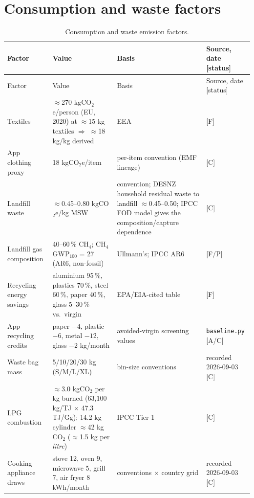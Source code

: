 \documentclass[11pt,a4paper]{article}
\begin{document}
\section{Consumption and waste factors}
\label{sec:waste}

\begin{longtable}{@{}p{4.6cm}p{3.4cm}p{4.6cm}p{3.6cm}@{}}
\caption{Consumption and waste emission factors.}\label{tab:waste}\\
\toprule
Factor & Value & Basis & Source, date [status] \\
\midrule
\endfirsthead
\toprule
Factor & Value & Basis & Source, date [status] \\
\midrule
\endhead
Textiles & $\approx$270 kgCO$_2$e/person (EU, 2020) at $\approx$15 kg textiles $\Rightarrow$ $\approx$18 kg/kg derived & EEA & \cite{eea_textiles} [F] \\
App clothing proxy & 18 kgCO$_2$e/item & per-item convention (EMF lineage) & \cite{emf_textiles} [C] \\
Landfill waste & $\approx$0.45--0.80 kgCO$_2$e/kg MSW & convention; DESNZ household residual waste to landfill $\approx$0.45--0.50; IPCC FOD model gives the composition/capture dependence & \cite{desnz2025, ipcc2006_vol5} [C] \\
Landfill gas composition & 40--60\,\% CH$_4$; CH$_4$ GWP$_{100}$ = 27 (AR6, non-fossil) & Ullmann's; IPCC AR6 & \cite{wiki_landfill, ipcc_ar6_ch7} [F/P] \\
Recycling energy savings & aluminium 95\,\%, plastics 70\,\%, steel 60\,\%, paper 40\,\%, glass 5--30\,\% vs.\ virgin & EPA/EIA-cited table & \cite{wiki_recycling} [F] \\
App recycling credits & paper $-4$, plastic $-6$, metal $-12$, glass $-2$ kg/month & avoided-virgin screening values & \texttt{baseline.py} [A/C] \\
Waste bag mass & 5/10/20/30 kg (S/M/L/XL) & bin-size conventions & recorded 2026-09-03 [C] \\
LPG combustion & $\approx$3.0 kgCO$_2$ per kg burned (63{,}100 kg/TJ $\times$ 47.3 TJ/Gg); 14.2 kg cylinder $\approx$42 kg CO$_2$ ($\approx$1.5 kg per \emph{litre}) & IPCC Tier-1 & \cite{ipcc2006_vol2} [C] \\
Cooking appliance draws & stove 12, oven 9, microwave 5, grill 7, air fryer 8 kWh/month & conventions $\times$ country grid & recorded 2026-09-03 [C] \\
\bottomrule
\end{longtable}
\end{document}
